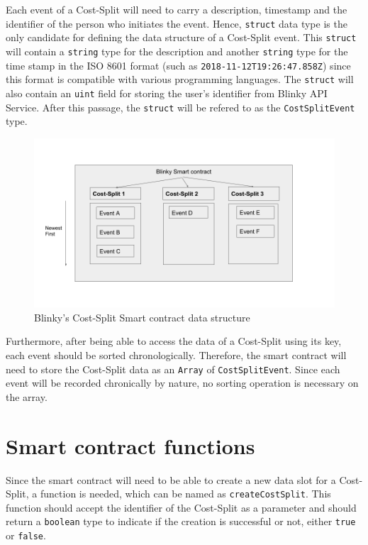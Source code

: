 \documentclass[twoside,draftfooter]{tutthesis} %
\begin{document}
Each event of a Cost-Split will need to carry a description, timestamp and the identifier of the person who initiates the event. Hence, \texttt{struct} data type is the only candidate for defining the data structure of a Cost-Split event. This \texttt{struct} will contain a \texttt{string} type for the description and another \texttt{string} type for the time stamp in the ISO 8601 format \citep{ISOFormat} (such as \texttt{2018-11-12T19:26:47.858Z}) since this format is compatible with various programming languages. The \texttt{struct} will also contain an \texttt{uint} field for storing the user's identifier from Blinky API Service. After this passage, the \texttt{struct} will be refered to as the \texttt{CostSplitEvent} type.
\label{DataStructure}

\begin{figure}
    \centering
    \includegraphics[width=\linewidth]{BlinkyCostSplitSmartContractDataStructure.png}
    \caption{Blinky's Cost-Split Smart contract data structure \citep{RefWorks:doc:MasteringBlockchain}}
    \label{fig:smartcontractdatastructure}
\end{figure}


Furthermore, after being able to access the data of a Cost-Split using its key, each event should be sorted chronologically. Therefore, the smart contract will need to store the Cost-Split data as an \texttt{Array} of \texttt{CostSplitEvent}. Since each event will be recorded chronically by nature, no sorting operation is necessary on the array.

\section{Smart contract functions}
\label{section:SmartContractFunctions}

Since the smart contract will need to be able to create a new data slot for a Cost-Split, a function is needed, which can be named as \texttt{createCostSplit}. This function should accept the identifier of the Cost-Split as a parameter and should return a \texttt{boolean} type to indicate if the creation is successful or not, either \texttt{true} or \texttt{false}.
\end{document}
